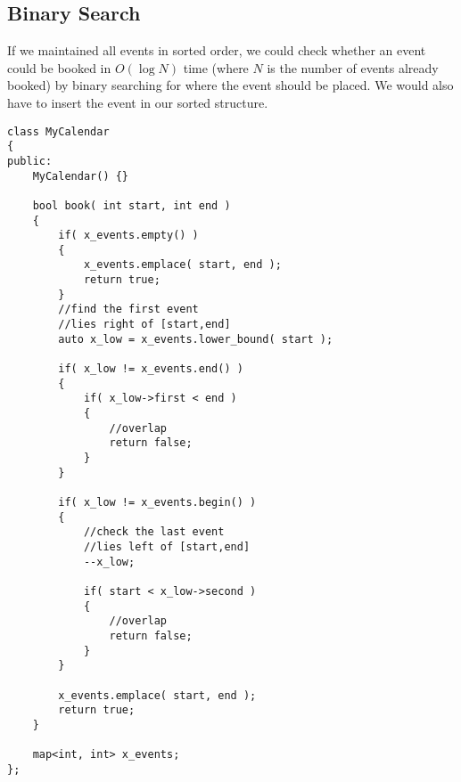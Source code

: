 \subsection{Binary Search}
If we maintained all events in sorted order, we could check whether an event could be booked in $O(\log N)$ time (where $N$ is the number of events already booked) by binary searching for where the event should be placed. We would also have to insert the event in our sorted structure.

\setcounter{lstlisting}{0}
\begin{lstlisting}[style=customc, caption={Binary Search}]
class MyCalendar
{
public:
    MyCalendar() {}

    bool book( int start, int end )
    {
        if( x_events.empty() )
        {
            x_events.emplace( start, end );
            return true;
        }
        //find the first event
        //lies right of [start,end]
        auto x_low = x_events.lower_bound( start );

        if( x_low != x_events.end() )
        {
            if( x_low->first < end )
            {
                //overlap
                return false;
            }
        }

        if( x_low != x_events.begin() )
        {
            //check the last event
            //lies left of [start,end]
            --x_low;

            if( start < x_low->second )
            {
                //overlap
                return false;
            }
        }

        x_events.emplace( start, end );
        return true;
    }

    map<int, int> x_events;
};
\end{lstlisting}